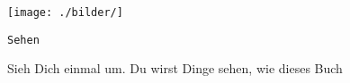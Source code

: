 \thispagestyle{empty}
\begin{center}
\texttt{[image: ./bilder/]}
\end{center}
\vskip 2cm
{\Huge\color{farbe}\hfill{\tt{Sehen}}}
\newpage
\lettrine[lines=2, lhang=.2, loversize=.25, lraise=0.05, findent=0.1em, nindent=0em]{S}{}ieh Dich einmal um. Du wirst Dinge sehen, wie dieses Buch 


\vfill

